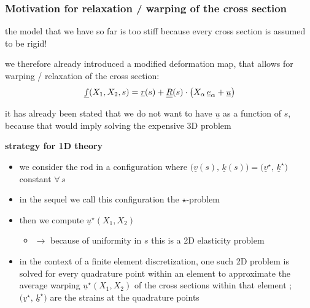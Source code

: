 \begin{frame}
  \frametitle{Motivation for relaxation / warping of the cross section}
  
  the model that we have so far is too stiff because every cross section is assumed to be rigid!

  \vspace{0.5em}
  we therefore already introduced a modified deformation map,
  that allows for warping / relaxation of the cross section:
  \begin{displaymath}
    \underline{f}(X_1,X_2,s) = 
    \underline{r}(s) + \underline{\underline{R}}(s) \cdot \bigl( X_{\alpha} \, \underline{e}_{\alpha} + \underline{u} \bigr)
  \end{displaymath}
  
  
  it has already been stated that we do not want to have $\underline{u}$ as a function of $s$, \newline
  because that would imply solving the expensive 3D problem
  
  \vspace{0.8em}
  \textbf{strategy for 1D theory}
  \begin{itemize}
    \item we consider the rod in a configuration where $\bigl( \underline{v}(s), \, \underline{k}(s) \bigr) = \bigl( \underline{v}^{\star}, \, \underline{k}^{\star} \bigr)$ constant $\forall \, s$
    \item in the sequel we call this configuration the $\star$-problem
    \item then we compute $\underline{u}^{\star}(X_1,X_2)$
      \begin{itemize}
        \item $\rightarrow$ because of uniformity in $s$ this is a 2D elasticity problem
      \end{itemize}
    \item in the context of a finite element discretization, one such 2D problem is solved for every quadrature point within an element to approximate the average warping $\underline{u}^{\star}(X_1,X_2)$ of the cross sections within that element ; $\bigl( \underline{v}^{\star}, \, \underline{k}^{\star} \bigr)$ are the strains at the quadrature points
  \end{itemize}
\end{frame}


